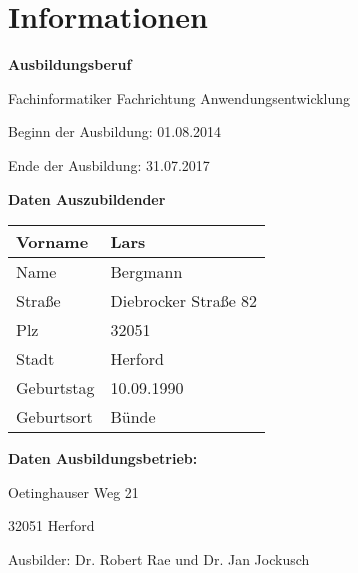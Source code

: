 \documentclass{pfdoc}
\begin{document}
\newpage

\section{Informationen}

\textbf{Ausbildungsberuf}

Fachinformatiker Fachrichtung Anwendungsentwicklung

Beginn der Ausbildung: 01.08.2014

Ende der Ausbildung: 31.07.2017

\vspace{1cm}

\textbf{Daten Auszubildender}

\begin{tabular}{|l|l|}
\hline
Vorname & Lars\\
\hline
Name & Bergmann\\
\hline
Straße & Diebrocker Straße 82\\
\hline
Plz & 32051\\
\hline
Stadt & Herford\\
\hline
Geburtstag & 10.09.1990\\
\hline
Geburtsort & Bünde\\ 
\hline
\end{tabular}

\vspace{1cm}

\textbf{Daten Ausbildungsbetrieb:}


Oetinghauser Weg 21

32051 Herford

Ausbilder: Dr. Robert Rae und Dr. Jan Jockusch

\newpage



\end{document}
